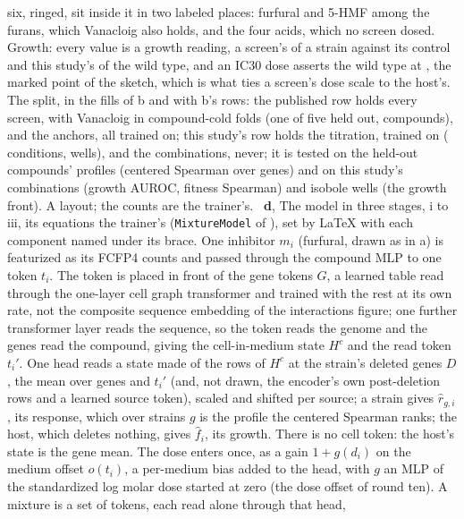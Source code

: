 six, ringed, sit inside it in two labeled places: furfural and 5-HMF among the furans,
which Vanacloig also holds, and the four acids, which no screen dosed. Growth:
every value is a
growth reading, a screen's of a strain against its control and this study's of the
wild type, and an IC30 dose asserts the wild type at \hydicThirtyFitness{}, the marked
point of the sketch, which is what ties a screen's dose scale to the host's. The split,
in the fills of b and with b's rows: the published row holds every screen, with Vanacloig
in compound-cold folds (one of five held out, \hydnVanacloigCompounds{} compounds), and
the \hydnAnchorsFour{} anchors, all trained on; this study's row holds the titration,
trained on (\hydnTitrationConditions{} conditions, \hydnTitrationWells{} wells), and the
combinations, never; it is tested on the held-out compounds' profiles
(centered Spearman over genes) and on this study's \hydnCombinations{} combinations
(growth AUROC, fitness Spearman) and \hydnIsoboleWells{} isobole wells (the growth
front). A layout; the counts are the trainer's. \,
\textbf{d}, The model in three stages, i to iii, its equations the trainer's
(\texttt{MixtureModel} of ), set by LaTeX with each
component named under its brace. One inhibitor $m_i$ (furfural, drawn as in a) is
featurized as its \hydnFingerprintBits{} FCFP4 counts and passed through the compound
MLP to one token $t_i$. The token is placed in front of the \hydnGeneTokens{} gene
tokens $G$, a learned table read through the one-layer cell graph transformer and
trained with the rest at its own rate, not the composite sequence embedding of the
interactions figure; one further transformer layer reads the sequence, so the token
reads the genome and the genes read the compound, giving the cell-in-medium state $H^c$
and the read token $t_i'$. One head reads a state made of the rows of $H^c$ at the
strain's deleted genes $D$, the mean over genes and $t_i'$ (and, not drawn, the
encoder's own post-deletion rows and a learned source token), scaled and shifted per
source; a strain gives $\hat r_{g,i}$, its response, which over strains $g$ is the
profile the centered Spearman ranks; the host, which deletes nothing, gives $\hat f_i$,
its growth. There is no cell token: the host's state is the gene mean. The dose enters
once, as a gain $1 + g(d_i)$ on the medium offset $o(t_i)$, a per-medium bias added to
the head, with $g$ an MLP of the standardized log molar dose started at zero (the dose
offset of round ten). A mixture is a set of tokens, each read alone through that head,
